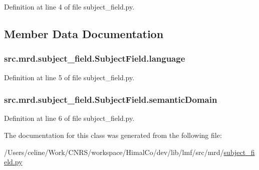 Definition at line 4 of file subject\+\_\+field.\+py.



\subsection{Member Data Documentation}
\hypertarget{classsrc_1_1mrd_1_1subject__field_1_1_subject_field_ab7baf8a7df0ac57286e05d3f8442424e}{
\subsubsection[{language}]{\setlength{\rightskip}{0pt plus 5cm}src.\+mrd.\+subject\+\_\+field.\+Subject\+Field.\+language}}\label{classsrc_1_1mrd_1_1subject__field_1_1_subject_field_ab7baf8a7df0ac57286e05d3f8442424e}


Definition at line 5 of file subject\+\_\+field.\+py.

\hypertarget{classsrc_1_1mrd_1_1subject__field_1_1_subject_field_a06a0125c3d3f9b33c5fad6a89994a123}{
\subsubsection[{semantic\+Domain}]{\setlength{\rightskip}{0pt plus 5cm}src.\+mrd.\+subject\+\_\+field.\+Subject\+Field.\+semantic\+Domain}}\label{classsrc_1_1mrd_1_1subject__field_1_1_subject_field_a06a0125c3d3f9b33c5fad6a89994a123}


Definition at line 6 of file subject\+\_\+field.\+py.



The documentation for this class was generated from the following file\+:\begin{DoxyCompactItemize}
\item 
/\+Users/celine/\+Work/\+C\+N\+R\+S/workspace/\+Himal\+Co/dev/lib/lmf/src/mrd/\hyperlink{subject__field_8py}{subject\+\_\+field.\+py}\end{DoxyCompactItemize}
